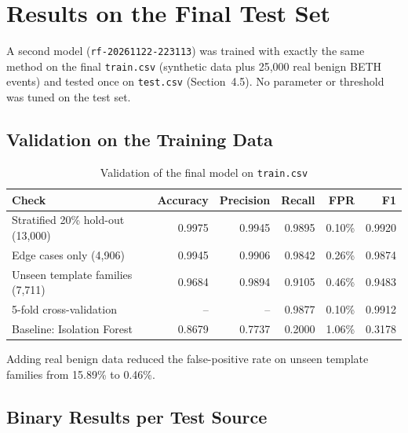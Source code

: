 \section{Results on the Final Test Set}

A second model (\texttt{rf-20261122-223113}) was trained with exactly the same method
on the final \texttt{train.csv} (synthetic data plus 25,000 real benign BETH events) and
tested once on \texttt{test.csv} (Section~4.5). No parameter or threshold was tuned on
the test set.

\subsection{Validation on the Training Data}

\begin{table}[H]
\centering
\caption{Validation of the final model on \texttt{train.csv}}
\label{tab:finalval}
\small
\begin{tabular}{lrrrrr}
\toprule
\textbf{Check} & \textbf{Accuracy} & \textbf{Precision} & \textbf{Recall} & \textbf{FPR} & \textbf{F1} \\
\midrule
Stratified 20\% hold-out (13,000)   & 0.9975 & 0.9945 & 0.9895 & 0.10\% & 0.9920 \\
Edge cases only (4,906)             & 0.9945 & 0.9906 & 0.9842 & 0.26\% & 0.9874 \\
Unseen template families (7,711)    & 0.9684 & 0.9894 & 0.9105 & 0.46\% & 0.9483 \\
5-fold cross-validation             & --     & --     & 0.9877 & 0.10\% & 0.9912 \\
Baseline: Isolation Forest          & 0.8679 & 0.7737 & 0.2000 & 1.06\% & 0.3178 \\
\bottomrule
\end{tabular}
\end{table}

Adding real benign data reduced the false-positive rate on unseen template families
from 15.89\% to 0.46\%.

\subsection{Binary Results per Test Source}

